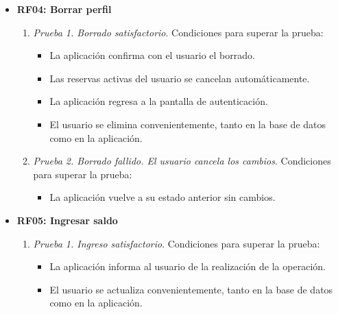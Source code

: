 \begin{itemize}
	\item \textbf{RF04: Borrar perfil}
	\begin{enumerate}
		\item \textit{Prueba 1. Borrado satisfactorio}. Condiciones para superar la prueba:
		\begin{itemize}
			\item La aplicación confirma con el usuario el borrado.
			\item Las reservas activas del usuario se cancelan automáticamente.
			\item La aplicación regresa a la pantalla de autenticación.
			\item El usuario se elimina convenientemente, tanto en la base de datos como en la aplicación.
		\end{itemize}
		\item \textit{Prueba 2. Borrado fallido. El usuario cancela los cambios}. Condiciones para superar la prueba:
		\begin{itemize}
			\item La aplicación vuelve a su estado anterior sin cambios.
		\end{itemize}
	\end{enumerate}
	
	\item \textbf{RF05: Ingresar saldo}
	\begin{enumerate}
		\item \textit{Prueba 1. Ingreso satisfactorio}. Condiciones para superar la prueba:
		\begin{itemize}
			\item La aplicación informa al usuario de la realización de la operación.
			\item El usuario se actualiza convenientemente, tanto en la base de datos como en la aplicación.
		\end{itemize}
	\end{enumerate}
	

\end{itemize}
